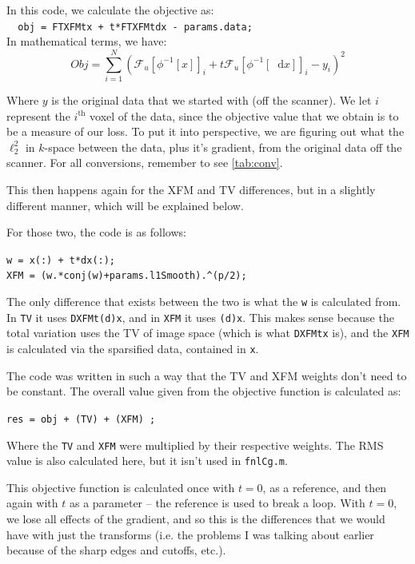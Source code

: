 \documentclass[11 pt]{article}
\newcommand*\diff{\mathop{}\!\mathrm{d}}
\begin{document}
            \noindent In this code, we calculate the objective as:\\
            \verb!  obj = FTXFMtx + t*FTXFMtdx - params.data;!\\

            \noindent In mathematical terms, we have:
            \[ Obj = \sum\limits_{i=1}^N \left(\mathcal{F}_u[\phi^{-1}[x]]_i + t\mathcal{F}_u[\phi^{-1}[\diff x]]_i - y_i\right)^2 \]

            Where $y$ is the original data that we started with (off the scanner). We let $i$ represent the $i^{\text{th}}$ voxel of the data, since the objective value that we obtain is to be a measure of our loss. To put it into perspective, we are figuring out what the $\ell_2^2$ in $k$-space between the data, plus it's gradient, from the original data off the scanner. For all conversions, remember to see \autoref{tab:conv}.

            This then happens again for the XFM and TV differences, but in a slightly different manner, which will be explained below. 

            For those two, the code is as follows:

            \verb!w = x(:) + t*dx(:);!\\ 
            \verb!XFM = (w.*conj(w)+params.l1Smooth).^(p/2);!

            The only difference that exists between the two is what the \texttt{w} is calculated from. In \texttt{TV} it uses \texttt{DXFMt(d)x}, and in \texttt{XFM} it uses \texttt{(d)x}. This makes sense because the total variation uses the TV of image space (which is what \texttt{DXFMtx} is), and the \texttt{XFM} is calculated via the sparsified data, contained in \texttt{x}.

            The code was written in such a way that the TV and XFM weights don't need to be constant. The overall value given from the objective function is calculated as:

            \verb!res = obj + (TV) + (XFM) ;!

            Where the \texttt{TV} and \texttt{XFM} were multiplied by their respective weights. The RMS value is also calculated here, but it isn't used in \texttt{fnlCg.m}.

            This objective function is calculated once with $t=0$, as a reference, and then again with $t$ as a parameter -- the reference is used to break a loop. With $t = 0$, we lose all effects of the gradient, and so this is the differences that we would have with just the transforms (i.e. the problems I was talking about earlier because of the sharp edges and cutoffs, etc.).\\\\
\end{document}
